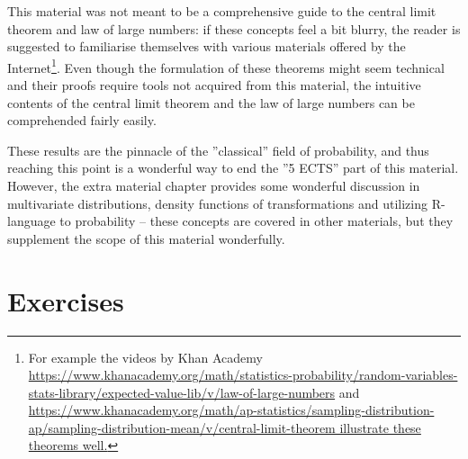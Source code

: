 \documentclass[12pt,a4paper,leqno]{report}
\theoremstyle{plain}
\theoremstyle{definition}
\begin{document}
\bigskip

This material was not meant to be a comprehensive guide to the central limit theorem and law of large numbers: if these concepts feel a bit blurry, the reader is suggested to familiarise themselves with various materials offered by the Internet\footnote{For example the videos by Khan Academy \url{https://www.khanacademy.org/math/statistics-probability/random-variables-stats-library/expected-value-lib/v/law-of-large-numbers} and \url{https://www.khanacademy.org/math/ap-statistics/sampling-distribution-ap/sampling-distribution-mean/v/central-limit-theorem illustrate these theorems well.}}. Even though the formulation of these theorems might seem technical and their proofs require tools not acquired from this material, the intuitive contents of the central limit theorem and the law of large numbers can be comprehended fairly easily.

These results are the pinnacle of the ''classical'' field of probability, and thus reaching this point is a wonderful way to end the ''5 ECTS'' part of this material. However, the extra material chapter provides some wonderful discussion in multivariate distributions, density functions of transformations and utilizing R-language to probability -- these concepts are covered in other materials, but they supplement the scope of this material wonderfully.

\section{Exercises}
\end{document}

